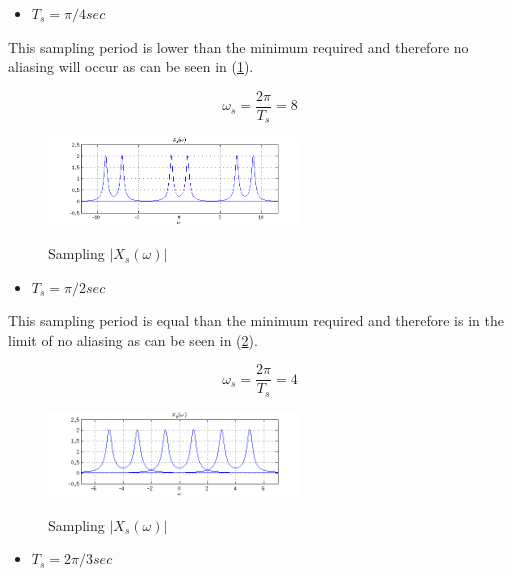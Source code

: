 \begin{itemize}
\item $T_s = \pi/4 sec$
\end{itemize} 

This sampling period is lower than the minimum required and therefore no
aliasing will occur as can be seen in (\ref{fig:c3p2a}).

\begin{equation*}
\omega_s = \frac{2 \pi}{T_s} = 8 
\end{equation*} 


\begin{figure}[H]
\caption{Sampling $|X_s(\omega)|$}
\centering
\includegraphics[width=0.6\textwidth]{figs/c3p2a.png}
\label{fig:c3p2a}
\end{figure}

\begin{itemize}
\item $T_s = \pi/2 sec$
\end{itemize} 

This sampling period is equal than the minimum required and therefore is
in the limit of no aliasing as can be seen in (\ref{fig:c3p2b}).

\begin{equation*}
\omega_s = \frac{2 \pi}{T_s} = 4
\end{equation*} 

\begin{figure}[H]
\caption{Sampling $|X_s(\omega)|$}
\centering
\includegraphics[width=0.6\textwidth]{figs/c3p2b.png}
\label{fig:c3p2b}
\end{figure}

\begin{itemize}
\item $T_s = 2 \pi/3 sec$
\end{itemize} 

